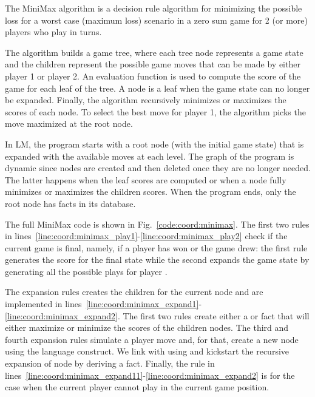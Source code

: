 The MiniMax algorithm is a decision rule algorithm for minimizing the possible
loss for a worst case (maximum loss) scenario in a zero sum game for 2 (or more)
players who play in turns.

The algorithm builds a game tree, where each tree node represents a game state
and the children represent the possible game moves that can be made by either
player 1 or player 2.  An evaluation function is used to compute the score of
the game for each leaf of the tree. A node is a leaf when the game state can no
longer be expanded. Finally, the algorithm recursively minimizes or maximizes
the scores of each node. To select the best move for player 1, the algorithm
picks the move maximized at the root node.

In LM, the program starts with a root node (with the initial game state) that
is expanded with the available moves at each level. The graph of the program is
dynamic since nodes are created and then deleted once they are no longer
needed. The latter happens when the leaf scores are computed or when a node
fully minimizes or maximizes the children scores. When the program ends, only
the root node has facts in its database.

The full MiniMax code is shown in Fig.~\ref{code:coord:minimax}. The first two
rules in lines~\ref{line:coord:minimax_play1}-\ref{line:coord:minimax_play2}
check if the current game is final, namely, if a player has won or the game
drew: the first rule generates the score for the final state while the second
expands the game state by generating all the possible plays for player
.

The expansion rules creates the children for the current node and are
implemented in
lines~\ref{line:coord:minimax_expand1}-\ref{line:coord:minimax_expand2}. The
first two rules create either a  or  fact that
will either maximize or minimize the scores of the children nodes.  The third
and fourth expansion rules simulate a player move and, for that, create a new
node  using the  language construct. We link  with
 using  and kickstart the recursive expansion of node
 by deriving a  fact. Finally, the rule in
lines~\ref{line:coord:minimax_expand11}-\ref{line:coord:minimax_expand2} is for
the case when the current player cannot play in the current game position.

